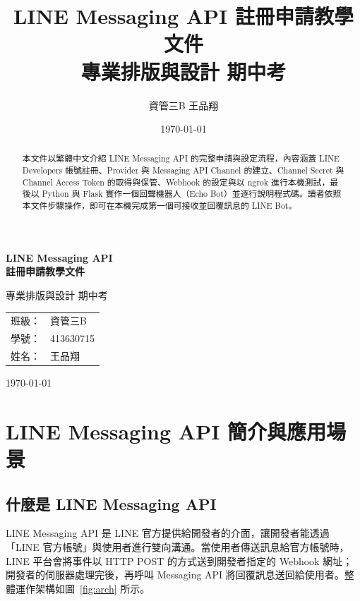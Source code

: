 \documentclass[12pt,a4paper]{report}
\title{\textbf{LINE Messaging API 註冊申請教學文件}\\[1em]\large 專業排版與設計 期中考}
\author{資管三B \quad 王品翔 \quad 413630715}
\date{\today}
\begin{document}
\begin{titlepage}
  \centering
  \vspace*{3cm}
  {\Huge\bfseries LINE Messaging API\\[0.5em] 註冊申請教學文件\par}
  \vspace{1.5cm}
  {\Large 專業排版與設計 期中考\par}
  \vspace{3cm}
  \begin{tabular}{rl}
    班級： & 資管三B \\[0.5em]
    學號： & 413630715 \\[0.5em]
    姓名： & 王品翔 \\
  \end{tabular}
  \vfill
  {\large \today\par}
\end{titlepage}

\begin{abstract}
本文件以繁體中文介紹 LINE Messaging API 的完整申請與設定流程，內容涵蓋 LINE Developers 帳號註冊、Provider 與 Messaging API Channel 的建立、Channel Secret 與 Channel Access Token 的取得與保管、Webhook 的設定與以 ngrok 進行本機測試，最後以 Python 與 Flask 實作一個回聲機器人（Echo Bot）並逐行說明程式碼。讀者依照本文件步驟操作，即可在本機完成第一個可接收並回覆訊息的 LINE Bot。
\end{abstract}

\tableofcontents
\listoffigures
\listoftables
\lstlistoflistings

\chapter{LINE Messaging API 簡介與應用場景}

\section{什麼是 LINE Messaging API}
LINE Messaging API 是 LINE 官方提供給開發者的介面，讓開發者能透過「LINE 官方帳號」與使用者進行雙向溝通。當使用者傳送訊息給官方帳號時，LINE 平台會將事件以 HTTP POST 的方式送到開發者指定的 Webhook 網址；開發者的伺服器處理完後，再呼叫 Messaging API 將回覆訊息送回給使用者。整體運作架構如圖~\ref{fig:arch} 所示。
\end{document}
